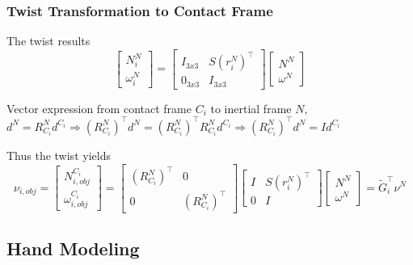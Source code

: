 \documentclass{beamer}
\begin{document}

\begin{frame}
\frametitle{Twist Transformation to Contact Frame}
The twist results
\begin{equation*}
\begin{bmatrix}
N_{i}^{N}\\
\omega_{i}^{N}
\end{bmatrix}=
\begin{bmatrix}
I_{3x3} & S(r_{i}^{N})^{\intercal}\\
0_{3x3} & I_{3x3} 
\end{bmatrix}
\begin{bmatrix}
N^N\\
\omega^{N}
\end{bmatrix}
\end{equation*}

Vector expression from contact frame ${C_i}$ to inertial frame ${N}$, $d^{N}=R_{C_i}^{N}d^{C_i}\Rightarrow (R_{C_i}^{N})^{\intercal}d^{N}=(R_{C_i}^{N})^{\intercal}R_{C_i}^{N}d^{C_i}\Rightarrow (R_{C_i}^{N})^{\intercal}d^{N}=Id^{C_i} $ \vspace{.2cm}

Thus the twist yields
\begin{equation*}
\nu_{i,obj}=
\begin{bmatrix}
N_{i,obj}^{C_i}\\
\omega_{i,obj}^{C_i}
\end{bmatrix}=
\begin{bmatrix}
(R_{C_i}^{N})^{\intercal} & 0\\
0 &(R_{C_i}^{N})^{\intercal} 
\end{bmatrix}
\begin{bmatrix}
I & S(r_{i}^{N})^{\intercal}\\
0 & I
\end{bmatrix}
\begin{bmatrix}
N^N\\
\omega^{N}
\end{bmatrix}=\tilde{G}^{\intercal}_i \nu^N
\end{equation*}
\end{frame}

\subsection{Hand Modeling}
\end{document}
